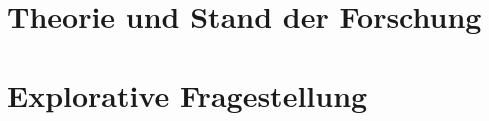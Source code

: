 \author{Neele \textsc{Elbersgerd}} 		%


			
		


	\pagestyle{empty} 		%
	
		
		
		\pagestyle{scrheadings} 	%
			\clearpairofpagestyles	%
			\ohead*{\pagemark}		%
			\ihead*{\rightmark} 	%

		\tableofcontents 			%
		\listoffigures				%
		\begingroup					%
			\let\clearpage\relax
			\listoftables			%
		\endgroup

			\label{Zusammenfassung}

	
		\clearpage
		\addchap{\abstractname}
	
		\clearpage
				
				
			\chapter{Theorie und Stand der Forschung} 		\label{theorie}
				
				
			\chapter{Explorative Fragestellung}				\label{fragestellung}
				
				
